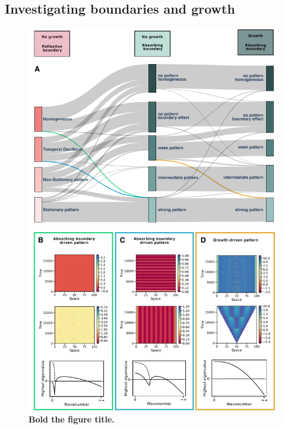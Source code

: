 \documentclass[10pt,letterpaper]{article}
\begin{document}
\subsection*{Investigating boundaries and growth}

\begin{figure}[!h]
    \includegraphics[width=1\textwidth]{figures/boundaries_growth}

    \caption{{\bf Bold the figure title.}
       }
    \label{fig5}
\end{figure}
\end{document}

